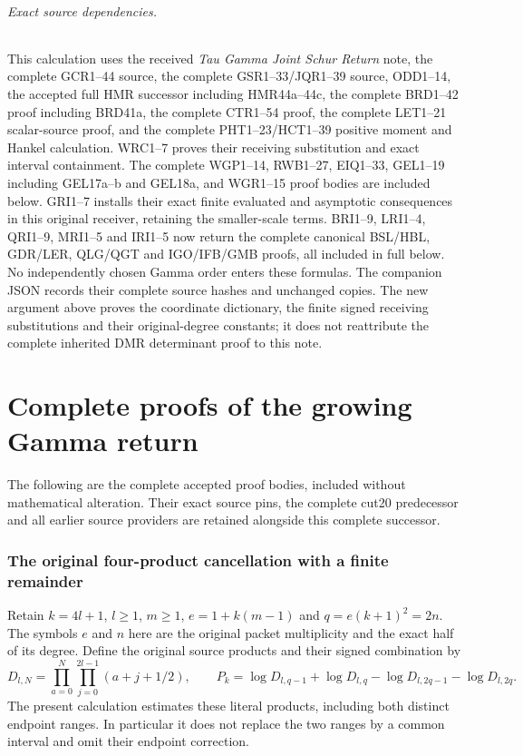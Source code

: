 \documentclass[11pt,a4paper]{article}
\begin{document}
\paragraph{Exact source dependencies.}
This calculation uses the received \emph{Tau Gamma Joint
Schur Return} note, the complete GCR1--44 source, the complete
GSR1--33/JQR1--39 source, ODD1--14, the accepted full
HMR successor including HMR44a--44c, the complete BRD1--42
proof including BRD41a, the complete CTR1--54 proof,
the complete LET1--21 scalar-source proof, and the complete
PHT1--23/HCT1--39 positive moment and Hankel calculation.
WRC1--7 proves their receiving substitution and exact interval
containment. The complete WGP1--14, RWB1--27, EIQ1--33,
GEL1--19 including GEL17a--b and GEL18a, and WGR1--15
proof bodies are included below. GRI1--7 installs their exact
finite evaluated and asymptotic consequences in this original
receiver, retaining the smaller-scale terms. BRI1--9, LRI1--4,
QRI1--9, MRI1--5 and IRI1--5 now return the complete canonical BSL/HBL,
GDR/LER, QLG/QGT and IGO/IFB/GMB proofs, all included in full
below. No independently chosen Gamma order enters these formulas.
The companion JSON
records their complete source hashes and unchanged copies.
The new argument above proves the coordinate dictionary,
the finite signed receiving substitutions and their
original-degree constants; it does not reattribute the
complete inherited DMR determinant proof to this note.

\clearpage
\part*{Complete proofs of the growing Gamma return}
The following are the complete accepted proof bodies, included without
mathematical alteration. Their exact source pins, the complete cut20
predecessor and all earlier source providers are retained alongside
this complete successor.

\section{The original four-product cancellation with a finite remainder}
\label{sec:WGP}

Retain $k=4l+1$, $l\ge1$, $m\ge1$, $e=1+k(m-1)$ and
$q=e(k+1)^2=2n$. The symbols $e$ and $n$ here are the original
packet multiplicity and the exact half of its degree. Define the original
source products and their signed combination by
\[
 D_{l,N}=\prod_{a=0}^{N}\prod_{j=0}^{2l-1}(a+j+1/2),\qquad
 P_k=\log D_{l,q-1}+\log D_{l,q}
       -\log D_{l,2q-1}-\log D_{l,2q}.
 \tag{WGP1}
\]
The present calculation estimates these literal products, including both
distinct endpoint ranges. In particular it does not replace the two ranges
by a common interval and omit their endpoint correction.
\end{document}

